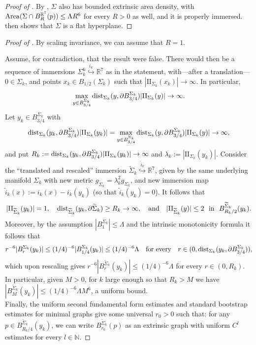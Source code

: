 \documentclass{article}
\newcommand{\N}{\mathbb{N}}
\newcommand{\R}{\mathbb{R}}
\theoremstyle{definition}
\begin{document}
\begin{proof}[Proof of ]
By , $\Sigma$ also has bounded extrinsic area density, with ${\rm Area}(\Sigma\cap B_R^{\R^7}(p))\leq \Lambda R^6$ for every $R>0$ as well, and it is properly immersed.
\cite[Theorem 1]{Bel25} then shows that $\Sigma$ is a flat hyperplane.
\end{proof}
\begin{proof}[Proof of ]
By scaling invariance, we can assume that $R=1$.

Assume, for contradiction, that the result were false. There would then be a sequence of immersions $\Sigma_k^6\overset{i_k}{\hookrightarrow} \R^7$ as in the statement, with---after a translation---$0\in\Sigma_k$, and points $x_k\in B_{1/2}(\Sigma_k)$ such that $|\mathrm{II}_{\Sigma_k}(x_k)|\to\infty$.
In particular,
$$\max_{y\in B_{3/4}^{\Sigma_k}}{\rm dist}_{\Sigma_k}(y,\partial B_{3/4}^{\Sigma_k})|\mathrm{II}_{\Sigma_k}(y)|\to\infty.$$
Let $y_k\in B_{3/4}^{\Sigma_k}$ with
$${\rm dist}_{\Sigma_k}(y_k,\partial B_{3/4}^{\Sigma_k})|\mathrm{II}_{\Sigma_k}(y_k)|=\max_{y\in B_{3/4}^{\Sigma_k}}{\rm dist}_{\Sigma_k}(y,\partial B_{3/4}^{\Sigma_k})|\mathrm{II}_{\Sigma_k}(y)|\to\infty,$$
and put $R_k:={\rm dist}_{\Sigma_k}(y_k,\partial B_{3/4}^{\Sigma_k})|\mathrm{II}_{\Sigma_k}(y_k)|\to\infty$ and $\lambda_k:=|\mathrm{II}_{\Sigma_k}(y_k)|$. Consider the ``translated and rescaled'' immersion $\widetilde \Sigma_k\overset{\widetilde i_k}{\hookrightarrow} \R^7$, given by the same underlying manifold $\Sigma_k$ with new metric $g_{\widetilde \Sigma_k}=\lambda_k^2g_{\Sigma_k}$, and new immersion map $\widetilde i_k(x):=i_k(x)-i_k(y_k)$ (so that $\widetilde i_k(y_k)=0$). It follows that
$$|\mathrm{II}_{\widetilde \Sigma_k}(y_k)|=1,\quad {\rm dist}_{\widetilde \Sigma_k}(y_k,\partial \widetilde \Sigma_k)\geq R_k\to\infty,\quad \mbox{and}\quad |\mathrm{II}_{\widetilde \Sigma_k}(y)|\leq 2 \ \mbox{ in } \ B_{R_k/2}^{\widetilde \Sigma_k}(y_k).$$
Moreover, by the assumption $|B_1^{\Sigma_k}|\leq \Lambda$ and the intrinsic monotonicity formula it follows that
$$r^{-6}|B_r^{\Sigma_k}(y_k)|\leq (1/4)^{-6}|B_{1/4}^{\Sigma_k}(y_k)|\leq (1/4)^{-6}\Lambda\quad \mbox{for every} \quad r\in(0,{\rm dist}_{\Sigma_k}(y_k,\partial B_{3/4}^{\Sigma_k})),$$
which upon rescaling gives $r^{-6}|B_r^{\widetilde \Sigma_k}(y_k)|\leq (1/4)^{-6}\Lambda$ for every $r\in (0,R_k)$. In particular, given $M>0$, for $k$ large enough so that $R_k>M$ we have $|B_M^{\widetilde \Sigma_k}(y_k)|\leq (1/4)^{-6}\Lambda M^6$, a uniform bound.\\
Finally, the uniform second fundamental form estimates and standard bootstrap estimates for minimal graphs give some universal $r_0>0$ such that: for any $p\in B_{R_k/4}^{\widetilde \Sigma_k}(y_k)$, we can write $B_{r_0}^{\widetilde \Sigma_k}(p)$ as an extrinsic graph with uniform $C^{l}$ estimates for every $l\in\N$.


\end{proof}
\end{document}
